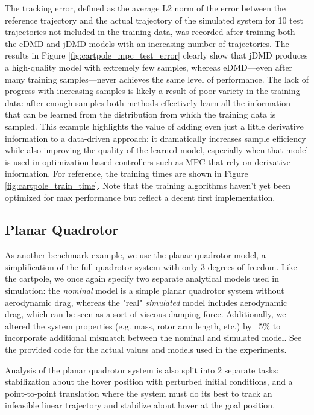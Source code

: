 \documentclass{article}
\begin{document}
The tracking error, defined as the average L2 norm of the error between the reference 
trajectory and the actual trajectory of the simulated system for 10 test trajectories not 
included in the training data, was recorded after training both the eDMD and jDMD models
with an increasing number of trajectories. The results in Figure
\ref{fig:cartpole_mpc_test_error} clearly show that jDMD produces a high-quality model with
extremely few samples, whereas eDMD---even after many training samples---never achieves the 
same level of performance. The lack of progress with increasing samples is likely a result 
of poor variety in the training data: after enough samples both methods effectively learn 
all the information that can be learned from the distribution from which the training data 
is sampled. This example highlights the value of adding even just a little derivative 
information to a data-driven approach: it dramatically increases sample efficiency while 
also improving the quality of the learned model, especially when that model is used in 
optimization-based controllers such as MPC that rely on derivative information. For 
reference, the training times are shown in Figure \ref{fig:cartpole_train_time}. Note that 
the training algorithms haven't yet been optimized for max performance but reflect a decent 
first implementation.


\subsection{Planar Quadrotor}
As another benchmark example, we use the planar quadrotor model, a simplification of the full quadrotor system with only 3 degrees of freedom. Like the cartpole, we once again specify two separate analytical models used in simulation: the \textit{nominal} model is a simple planar quadrotor system without aerodynamic drag, whereas the "real" \textit{simulated} model includes aerodynamic drag, which can be seen as a sort of viscous damping force. Additionally, we altered the system properties (e.g. mass, rotor arm length, etc.) by ~5\% to incorporate additional mismatch between the nominal and simulated model. See the provided code for the actual values and models used in the experiments.

Analysis of the planar quadrotor system is also split into 2 separate tasks: stabilization
about the hover position with perturbed initial conditions, and a point-to-point translation
where the system must do its best to track an infeasible linear trajectory and stabilize
about hover at the goal position.
\end{document}
